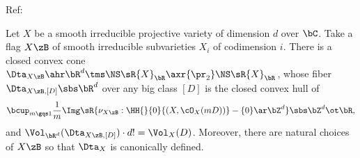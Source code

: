 \documentclass[a4paper, twoside]{article}
\begin{document}
\ifmain
    \title{}
    \author{Cong Wen, 09/24}
    \makeatletter
    \makeatother


    \tableofcontents
\fi


Ref:~\cite{LM2009Convex}


\begin{thm}
    Let $X$ be a smooth irreducible projective variety of dimension $d$ over $\bC$. Take a flag $X\zB$ of smooth irreducible subvarieties $X_{i}$ of codimension $i$. There is a closed convex cone $\Dta_{X\zB}\ahr\bR^{d}\tms\NS\sR{X}_{\bR}\axr{\pr_{2}}\NS\sR{X}_{\bR}$, whose fiber $\Dta_{X\zB,[D]}\sbs\bR^{d}$ over any big class $[D]$ is the closed convex hull of
    \[
        \bcup_{m\gqs1}\frac{1}{m}\Img\sR{\nu_{X\zB}:\HH{}{0}{(X,\cO_{X}(mD))}-\{0\}\ar\bZ^{d}}\sbs\bZ^{d}\ot\bR,
    \]
    and $\Vol_{\bR^{d}}(\Dta_{X\zB,[D]})\cdot d!=\Vol_{X}(D)$. Moreover, there are natural choices of $X\zB$ so that $\Dta_{X}$ is canonically defined.
\end{thm}








\ifmain
    
    
\fi
\end{document}
